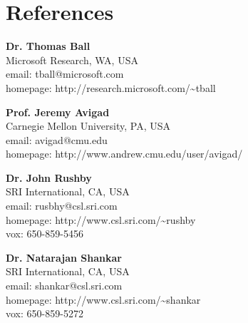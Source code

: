 \documentclass{article}
\newcommand{\REF}[2]{\begin{flushleft} {\bf #1} \\
                                                                           #2
                                         \end{flushleft}
                    }
\begin{document}


\section*{References}

\REF{Dr. Thomas Ball}
    {Microsoft Research, WA, USA \\
     email: tball@microsoft.com \\
     homepage:   http://research.microsoft.com/\~{ }tball
}

\REF{Prof. Jeremy Avigad}
    {Carnegie Mellon University, PA, USA \\
     email: avigad@cmu.edu \\
     homepage:  http://www.andrew.cmu.edu/user/avigad/}

\REF{Dr. John Rushby}
    {SRI International, CA, USA \\
    email: rusbhy@csl.sri.com \\
    homepage: http://www.csl.sri.com/\~{ }rushby \\
    vox: 650-859-5456
    }

\REF{Dr. Natarajan Shankar}
    {SRI International, CA, USA \\
    email: shankar@csl.sri.com \\
    homepage: http://www.csl.sri.com/\~{ }shankar \\
    vox: 650-859-5272
    }



\end{document}
